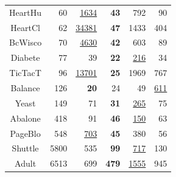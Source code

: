 \begin{table}
\begin{center}
\begin{tabular}{crrrrr}
 HeartHu &    60 &   \underline{1634} &   \textbf{43} &               792 &               90 \\
 HeartCl &    62 &  \underline{34381} &   \textbf{47} &              1433 &              404 \\
 BcWisco &    70 &   \underline{4630} &   \textbf{42} &               603 &               89 \\
 Diabete &    77 &                 39 &   \textbf{22} &   \underline{216} &               34 \\
 TicTacT &    96 &  \underline{13701} &   \textbf{25} &              1969 &              767 \\
 Balance &   126 &        \textbf{20} &            24 &                49 &  \underline{611} \\
   Yeast &   149 &                 71 &   \textbf{31} &   \underline{265} &               75 \\
 Abalone &   418 &                 91 &   \textbf{46} &   \underline{150} &               63 \\
 PageBlo &   548 &    \underline{703} &   \textbf{45} &               380 &               56 \\
 Shuttle &  5800 &                535 &   \textbf{99} &   \underline{717} &              130 \\
   Adult &  6513 &                699 &  \textbf{479} &  \underline{1555} &              945 \\
\end{tabular}
\end{center}
\end{table}

